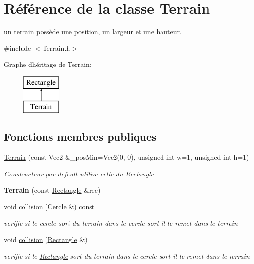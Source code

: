 \hypertarget{class_terrain}{}\section{Référence de la classe Terrain}
\label{class_terrain}


un terrain possède une position, un largeur et une hauteur.  




{\ttfamily \#include $<$Terrain.\+h$>$}

Graphe d\textquotesingle{}héritage de Terrain\+:\begin{figure}[H]
\begin{center}
\leavevmode
\includegraphics[height=2.000000cm]{class_terrain}
\end{center}
\end{figure}
\subsection*{Fonctions membres publiques}
\begin{DoxyCompactItemize}
\item 
\mbox{\label{class_terrain_a3b01a8d47de9ad7b913236c1ab9f62ce}} 
\mbox{\hyperlink{class_terrain_a3b01a8d47de9ad7b913236c1ab9f62ce}{Terrain}} (const Vec2 \&\+\_\+pos\+Min=Vec2(0, 0), unsigned int w=1, unsigned int h=1)
\begin{DoxyCompactList}\small\item\em Constructeur par default utilise celle du \mbox{\hyperlink{class_rectangle}{Rectangle}}. \end{DoxyCompactList}\item 
\mbox{\label{class_terrain_a193cb653a018575760d02e2819cb550c}} 
{\bfseries Terrain} (const \mbox{\hyperlink{class_rectangle}{Rectangle}} \&rec)
\item 
void \mbox{\hyperlink{class_terrain_a9546059cb210f4e4f90905ba9d0f23ea}{collision}} (\mbox{\hyperlink{class_cercle}{Cercle}} \&) const
\begin{DoxyCompactList}\small\item\em verifie si le cercle sort du terrain dans le cercle sort il le remet dans le terrain \end{DoxyCompactList}\item 
\mbox{\label{class_terrain_a981fe71718eaa146e0b8fe7bb771b38c}} 
void \mbox{\hyperlink{class_terrain_a981fe71718eaa146e0b8fe7bb771b38c}{collision}} (\mbox{\hyperlink{class_rectangle}{Rectangle}} \&)
\begin{DoxyCompactList}\small\item\em verifie si le \mbox{\hyperlink{class_rectangle}{Rectangle}} sort du terrain dans le cercle sort il le remet dans le terrain \end{DoxyCompactList}\end{DoxyCompactItemize}
